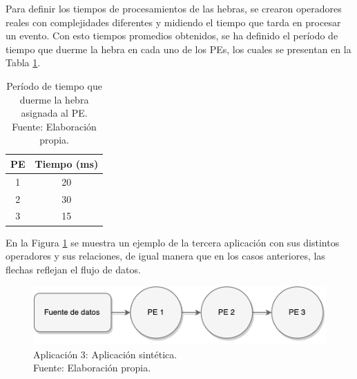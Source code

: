 
Para definir los tiempos de procesamientos de las hebras, se crearon operadores reales con complejidades diferentes y midiendo el tiempo que tarda en procesar un evento. Con esto tiempos promedios obtenidos, se ha definido el per\'iodo de tiempo que duerme la hebra en cada uno de los PEs, los cuales se presentan en la Tabla \ref{tab:app3-time}.


\begin{table}[!ht]
\centering
\captionsetup{justification=centering}
\caption[Per\'iodo de tiempo que duerme la hebra asignada al PE.]{Per\'iodo de tiempo que duerme la hebra asignada al PE.\\Fuente: Elaboraci\'on propia.}
\begin{tabular}{| c | c |}
\hline
PE & Tiempo (ms) \\ \hline
1 & 20 \\
2 & 30 \\
3 & 15 \\\hline
\end{tabular}
\label{tab:app3-time}
\end{table}

En la Figura \ref{fig:terceraAplicacion} se muestra un ejemplo de la tercera aplicaci\'on con sus distintos operadores y sus relaciones, de igual manera que en los casos anteriores, las flechas reflejan el flujo de datos.

\begin{figure}[!ht]
	\centering
	\captionsetup{justification=centering}
		\includegraphics[scale=0.6]{images/App3.pdf}
	\caption[Aplicaci\'on 3: Aplicaci\'on sint\'etica.]{Aplicaci\'on 3: Aplicaci\'on sint\'etica.\\Fuente: Elaboraci\'on propia.}
	\label{fig:terceraAplicacion}
\end{figure}

